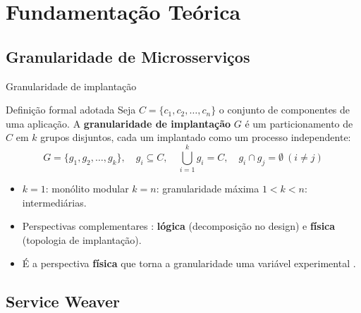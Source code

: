 

\section[Fundamentação]{Fundamentação Teórica}
\label{sec:fundamentacao-teorica}

\subsection{Granularidade de Microsserviços}
\label{subsec:granularidade}

\begin{frame}{Granularidade de implantação}
    \begin{block}{Definição formal adotada}
        \small Seja $C = \{c_1, c_2, \ldots, c_n\}$ o conjunto de componentes de uma aplicação. A \textbf{granularidade de implantação} $G$ é um particionamento de $C$ em $k$ grupos disjuntos, cada um implantado como um processo independente:
        \[
            G = \{g_1, g_2, \ldots, g_k\}, \quad g_i \subseteq C, \quad \textstyle\bigcup_{i=1}^{k} g_i = C, \quad g_i \cap g_j = \emptyset \ (i \neq j)
        \]
    \end{block}
    \begin{itemize}
        \item $k = 1$: monólito modular \qquad $k = n$: granularidade máxima \qquad $1 < k < n$: intermediárias.
        \item Perspectivas complementares \cite{hassan2017ambients}: \textbf{lógica} (decomposição no design) e \textbf{física} (topologia de implantação).
        \item É a perspectiva \textbf{física} que torna a granularidade uma variável experimental \cite{verarivera2021granularity}.
    \end{itemize}
\end{frame}

\subsection{Service Weaver}
\label{subsec:serviceweaver}

